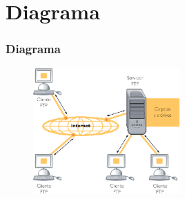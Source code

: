 \section{Diagrama}
  \begin{frame}
    \frametitle{Diagrama}
      \begin{figure}
      \centering
      \includegraphics[width=0.5\textwidth]{./image/diagramaFTP.png}
      \label{fig:ejemplo}
      \end{figure}
  \end{frame}